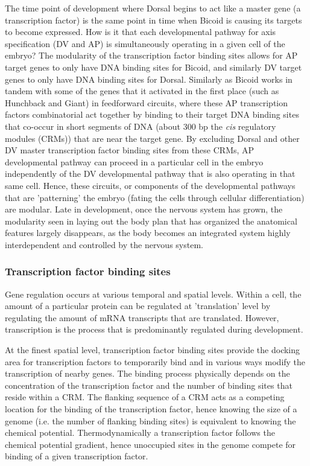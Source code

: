 The time point of development where Dorsal begins to act like a master gene (a transcription factor) is the same point in time when Bicoid is causing its targets to become expressed.  How is it that each developmental pathway for axis specification (DV and AP) is simultaneously operating in a given cell of the embryo?  The modularity of the transcription factor binding sites allows for AP target genes to only have DNA binding sites for Bicoid, and similarly DV target genes to only have DNA binding sites for Dorsal.  Similarly as Bicoid works in tandem with some of the genes that it activated in the first place (such as Hunchback and Giant) in feedforward circuits, where these AP transcription factors combinatorial act together by binding to their target DNA binding sites that co-occur in short segments of DNA (about 300 bp the \textit{cis} regulatory modules (CRMs)) that are near the target gene.  By excluding Dorsal and other DV master transcription factor binding sites from these CRMs, AP developmental pathway can proceed in a particular cell in the embryo independently of the DV developmental pathway that is also operating in that same cell.  Hence, these circuits, or components of the developmental pathways that are 'patterning' the embryo (fating the cells through cellular differentiation) are modular.  Late in development, once the nervous system has grown, the modularity seen in laying out the body plan that has organized the anatomical features largely disappears, as the body becomes an integrated system highly interdependent and controlled by the nervous system.

\subsubsection{Transcription factor binding sites}
Gene regulation occurs at various temporal and spatial levels.  Within a cell, the amount of a particular protein can be regulated at 'translation' level by regulating the amount of mRNA transcripts that are translated.  However, transcription is the process that is predominantly regulated during development.  

At the finest spatial level, transcription factor binding sites provide the docking area for transcription factors to temporarily bind and in various ways modify the transcription of nearby genes.  The binding process physically depends on the concentration of the transcription factor and the number of binding sites that reside within a CRM.  The flanking sequence of a CRM acts as a competing location for the binding of the transcription factor, hence knowing the size of a genome (i.e. the number of flanking binding sites) is equivalent to knowing the chemical potential.  Thermodynamically a transcription factor follows the chemical potential gradient, hence unoccupied sites in the genome compete for binding of a given transcription factor.  

